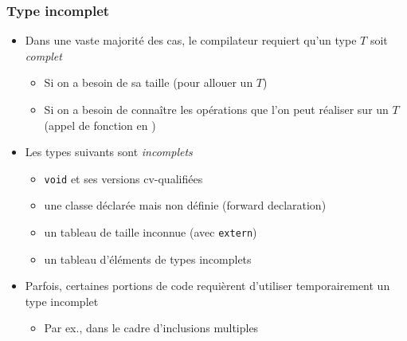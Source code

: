 \begin{frame}
\frametitle{Type incomplet}
\begin{itemize}[<+->]
\item Dans une vaste majorité des cas, le compilateur requiert qu'un type $T$ soit \emph{complet}
	\begin{itemize}
	\item Si on a besoin de sa taille (pour allouer un $T$)
	\item Si on a besoin de connaître les opérations que l'on peut réaliser sur un $T$ (appel de fonction en \cpp)
	\end{itemize}
\item Les types suivants sont \emph{incomplets}
	\begin{itemize}
	\item \lstinline|void| et ses versions cv-qualifiées
	\item une classe déclarée mais non définie (forward declaration)
	\item un tableau de taille inconnue (avec \lstinline|extern|)
	\item un tableau d'éléments de types incomplets
	\end{itemize}
\item Parfois, certaines portions de code requièrent d'utiliser temporairement un type incomplet
	\begin{itemize}
	\item Par ex., dans le cadre d'inclusions multiples
	\end{itemize}
\end{itemize}
\end{frame}

